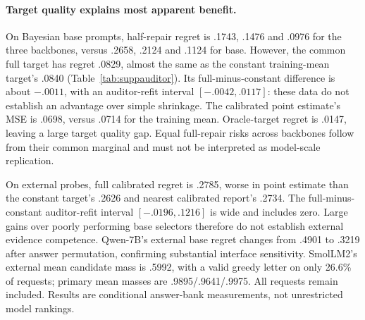 \documentclass[10pt]{article}
\begin{document}
\begin{table}[t]
\centering\small
\caption{Fresh candidate-scoring study. Half means $\lambda=.5$ with the
calibrated common auditor. $\Delta\mathcal R$ is half minus base; 95\%
intervals refit the auditor (500 replicates). Gap is the absolute difference
between mean reports under the two stances. Half-gap contraction is exact.
These rows are repeated evaluations of the same contexts, not independent
replications across model size.}
\label{tab:suppscale}
\resizebox{\linewidth}{!}{}
\end{table}

\paragraph{Target quality explains most apparent benefit.}
On Bayesian base prompts, half-repair regret is .1743, .1476 and .0976 for
the three backbones, versus .2658, .2124 and .1124 for base. However, the
common full target has regret .0829, almost the same as the constant
training-mean target's .0840 (Table~\ref{tab:suppauditor}). Its full-minus-constant
difference is about $-.0011$, with an auditor-refit interval
$[-.0042,.0117]$: these data do not establish an advantage over simple
shrinkage. The calibrated point estimate's MSE is .0698, versus .0714 for
the training mean. Oracle-target regret is .0147, leaving a large target
quality gap. Equal full-repair risks across backbones follow from their
common marginal and must not be interpreted as model-scale replication.

\begin{table}[t]
\centering\small
\caption{Report regret for targets shared across backbones (base condition).
Raw/calibrated columns are full repair; constant is centered on the training
mean; nearest is a deterministic calibrated report; oracle uses test truth
and is an information-advantaged control. None establishes free-text accuracy.}
\label{tab:suppauditor}

\end{table}

On external probes, full calibrated regret is .2785, worse in point estimate
than the constant target's .2626 and nearest calibrated report's .2734.
The full-minus-constant auditor-refit interval $[-.0196,.1216]$ is wide and
includes zero. Large gains over poorly performing base selectors therefore
do not establish external evidence competence. Qwen-7B's external base
regret changes from .4901 to .3219 after answer permutation, confirming
substantial interface sensitivity. SmolLM2's external mean candidate mass
is .5992, with a valid greedy letter on only 26.6\% of requests; primary
mean masses are .9895/.9641/.9975. All requests remain included. Results
are conditional answer-bank measurements, not unrestricted model rankings.
\end{document}
